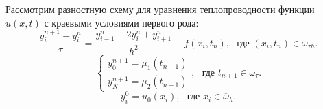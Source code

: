 \documentclass[11pt,a4paper,twoside,listtotoc,bibtotoc]{report}
\numberwithin{equation}{section}
\theoremstyle{definition}
\theoremstyle{plain}
\begin{document}
Рассмотрим разностную схему для уравнения теплопроводности функции $u(x,t)$ с
краевыми условиями первого рода:
%
\begin{equation}
%
    \label{diskr_temp_equ_2}
    \frac{y_i^{n+1} - y_i^n}{\tau} = \frac{y_{i-1}^{n} - 2y_i^n + y_{i+1}^n}{h^2}
    + f(x_i,t_n),~~~\mbox{где $(x_i, t_n)\in \omega_{\tau h}$.}
%
\end{equation}
%
%
\begin{equation}
%
    \label{bord_diskr_2}
    \begin{cases}
            y_0^{n+1} = \mu_1(t_{n+1}) \\
            y_N^{n+1} = \mu_2(t_{n+1})
        \end{cases}
        ,~~~\mbox{где $t_{n+1}\in \overline{\omega}_{\tau}$.}
%
\end{equation}
%
%
\begin{equation}
%
    \label{start_diskr_2}
    y_i^0 = u_0(x_i),~~~\mbox{где $x_i\in \overline{\omega}_h$.}
%
\end{equation}
%
\fi %
\end{document}
